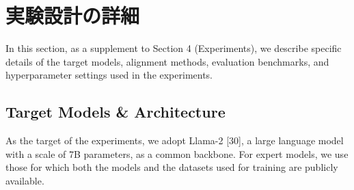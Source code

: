 \documentclass{article}
\begin{document}
\section{実験設計の詳細}

In this section, as a supplement to Section 4 (Experiments), we describe specific details of the target models, alignment methods, evaluation benchmarks, and hyperparameter settings used in the experiments.

\subsection{Target Models \& Architecture}
\label{app:Target Models \& Architecture}

As the target of the experiments, we adopt Llama-2 [30], a large language model with a scale of 7B parameters, as a common backbone. For expert models, we use those for which both the models and the datasets used for training are publicly available.

\end{document}
